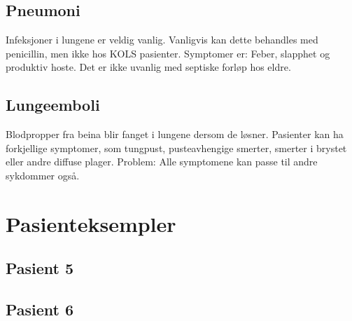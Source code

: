 			\subsection{Pneumoni}
				Infeksjoner i lungene er veldig vanlig. Vanligvis kan dette behandles med penicillin, men ikke hos KOLS pasienter. Symptomer er: Feber, slapphet og produktiv hoste. Det er ikke uvanlig med septiske forløp hos eldre. 
			\subsection{Lungeemboli}
				Blodpropper fra beina blir fanget i lungene dersom de løsner. Pasienter kan ha forkjellige symptomer, som tungpust, pusteavhengige smerter, smerter i brystet eller andre diffuse plager. Problem: Alle symptomene kan passe til andre sykdommer også.
		\section{Pasienteksempler}
			\subsection{Pasient 5}
			\subsection{Pasient 6}